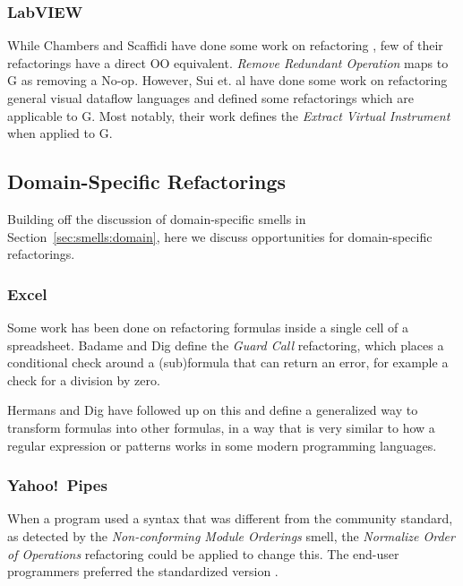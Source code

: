 \documentclass[10pt,conference,compsocconf]{IEEEtran}
\begin{document}
\subsubsection{LabVIEW}

While Chambers and Scaffidi have done some work on refactoring \cite{chambers2015impact}, few of their refactorings have a direct OO equivalent. \emph{Remove Redundant Operation} maps to G as removing a No-op.
However, Sui et. al \cite{sui2008automated} have done some work on refactoring general visual dataflow languages and defined some refactorings which are applicable to G.
Most notably, their work defines the \textit{Extract Virtual Instrument} when applied to G.

\subsection{Domain-Specific Refactorings}

Building off the discussion of domain-specific smells in Section~\ref{sec:smells:domain}, here we discuss opportunities for domain-specific refactorings. 

\subsubsection{Excel}

Some work has been done on refactoring formulas inside a single cell of a spreadsheet. Badame and Dig \cite{badame2012refactoring} define the \textit{Guard Call} refactoring, which places a conditional check around a (sub)formula that can return an error, for example a check for a division by zero.

Hermans and Dig \cite{hermans2014bumblebee} have followed up on this and define a generalized way to transform formulas into other formulas, in a way that is very similar to how a regular expression or patterns works in some modern programming languages.

\subsubsection{Yahoo!\ Pipes}
\label{sec:yp:domainrefactor}
When a program used a syntax that was different from the community standard, as detected by the \emph{Non-conforming Module Orderings} smell, the \emph{Normalize Order of Operations} refactoring could be applied to change this. The end-user programmers preferred the standardized version \cite{StoleeTSE2013}. 
\end{document}

